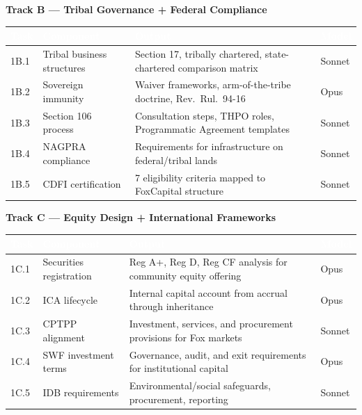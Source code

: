 \documentclass[11pt,letterpaper]{article}
\newcommand{\tableheader}[1]{\textbf{\sffamily\textcolor{white}{#1}}}
\begin{document}
\textbf{Track B --- Tribal Governance + Federal Compliance}

\begin{center}
\begin{tabularx}{\textwidth}{C{0.8cm}L{3cm}XC{1.5cm}}
\toprule
{}
\tableheader{Task} & \tableheader{Component} & \tableheader{Output} & \tableheader{Model} \\
\midrule
1B.1 & Tribal business structures & Section 17, tribally chartered, state-chartered comparison matrix & Sonnet \\
1B.2 & Sovereign immunity & Waiver frameworks, arm-of-the-tribe doctrine, Rev.\ Rul.\ 94-16 & Opus \\
1B.3 & Section 106 process & Consultation steps, THPO roles, Programmatic Agreement templates & Sonnet \\
1B.4 & NAGPRA compliance & Requirements for infrastructure on federal/tribal lands & Sonnet \\
1B.5 & CDFI certification & 7 eligibility criteria mapped to FoxCapital structure & Sonnet \\
\bottomrule
\end{tabularx}
\end{center}

\textbf{Track C --- Equity Design + International Frameworks}

\begin{center}
\begin{tabularx}{\textwidth}{C{0.8cm}L{3cm}XC{1.5cm}}
\toprule
{}
\tableheader{Task} & \tableheader{Component} & \tableheader{Output} & \tableheader{Model} \\
\midrule
1C.1 & Securities registration & Reg A+, Reg D, Reg CF analysis for community equity offering & Opus \\
1C.2 & ICA lifecycle & Internal capital account from accrual through inheritance & Opus \\
1C.3 & CPTPP alignment & Investment, services, and procurement provisions for Fox markets & Sonnet \\
1C.4 & SWF investment terms & Governance, audit, and exit requirements for institutional capital & Opus \\
1C.5 & IDB requirements & Environmental/social safeguards, procurement, reporting & Sonnet \\
\bottomrule
\end{tabularx}
\end{center}
\end{document}
